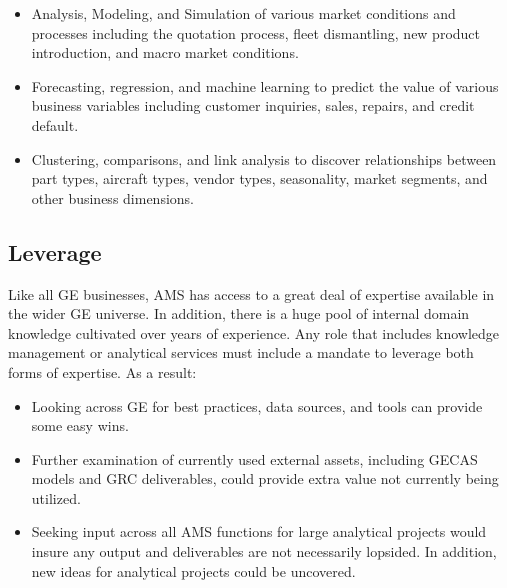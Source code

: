 \documentclass[10pt,journal,compsoc]{IEEEtran}
\begin{document}
    \begin{itemize}
        \item Analysis, Modeling, and Simulation of various market conditions
        and processes including the quotation process, fleet dismantling,
        new product introduction, and macro market conditions.

        \item Forecasting, regression, and machine learning to predict the
        value of various business variables including customer inquiries,
        sales, repairs, and credit default.

        \item Clustering, comparisons, and link analysis to discover relationships
        between part types, aircraft types, vendor types, seasonality, market
        segments, and other business dimensions.
    \end{itemize}

    \subsection{Leverage}

    Like all GE businesses, AMS has access to a great deal of expertise
    available in the wider GE universe.  In addition, there is a huge pool
    of internal domain knowledge cultivated over years of experience.  Any role
    that includes knowledge management or analytical services must include
    a mandate to leverage both forms of expertise.  As a result:

    \begin{itemize}
        \item Looking across GE for best practices, data sources, and tools
        can provide some easy wins.

        \item Further examination of currently used external assets, including
        GECAS models and GRC deliverables, could provide extra value not currently
        being utilized.

        \item Seeking input across all AMS functions for large analytical projects
        would insure any output and deliverables are not necessarily lopsided.
        In addition, new ideas for analytical projects could be uncovered.
    \end{itemize}

\end{document}
